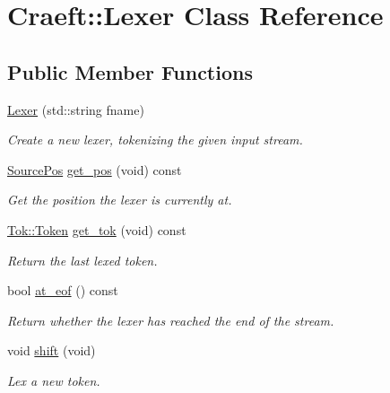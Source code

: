 \hypertarget{class_craeft_1_1_lexer}{}\section{Craeft\+:\+:Lexer Class Reference}
\label{class_craeft_1_1_lexer}
\subsection*{Public Member Functions}
\begin{DoxyCompactItemize}
\item 
\hyperlink{class_craeft_1_1_lexer_a52dbd45faef58e7ea838d02cd7198037}{Lexer} (std\+::string fname)
\begin{DoxyCompactList}\small\item\em Create a new lexer, tokenizing the given input stream. \end{DoxyCompactList}\item 
\hypertarget{class_craeft_1_1_lexer_ae63a7e1707391ab861ed9195a2b1cca6}{}\label{class_craeft_1_1_lexer_ae63a7e1707391ab861ed9195a2b1cca6} 
\hyperlink{struct_craeft_1_1_source_pos}{Source\+Pos} \hyperlink{class_craeft_1_1_lexer_ae63a7e1707391ab861ed9195a2b1cca6}{get\+\_\+pos} (void) const
\begin{DoxyCompactList}\small\item\em Get the position the lexer is currently at. \end{DoxyCompactList}\item 
\hypertarget{class_craeft_1_1_lexer_a92ce6b920fff270ac55c9542207c0d4d}{}\label{class_craeft_1_1_lexer_a92ce6b920fff270ac55c9542207c0d4d} 
\hyperlink{_token_8hh_a521c5743a63e2d5d1871557794e0a8b1}{Tok\+::\+Token} \hyperlink{class_craeft_1_1_lexer_a92ce6b920fff270ac55c9542207c0d4d}{get\+\_\+tok} (void) const
\begin{DoxyCompactList}\small\item\em Return the last lexed token. \end{DoxyCompactList}\item 
\hypertarget{class_craeft_1_1_lexer_ac3b24e7a7f9202ab54550334904dd008}{}\label{class_craeft_1_1_lexer_ac3b24e7a7f9202ab54550334904dd008} 
bool \hyperlink{class_craeft_1_1_lexer_ac3b24e7a7f9202ab54550334904dd008}{at\+\_\+eof} () const
\begin{DoxyCompactList}\small\item\em Return whether the lexer has reached the end of the stream. \end{DoxyCompactList}\item 
\hypertarget{class_craeft_1_1_lexer_a64a72871a0d35c35d07e887fd39d0d70}{}\label{class_craeft_1_1_lexer_a64a72871a0d35c35d07e887fd39d0d70} 
void \hyperlink{class_craeft_1_1_lexer_a64a72871a0d35c35d07e887fd39d0d70}{shift} (void)
\begin{DoxyCompactList}\small\item\em Lex a new token. \end{DoxyCompactList}\end{DoxyCompactItemize}


